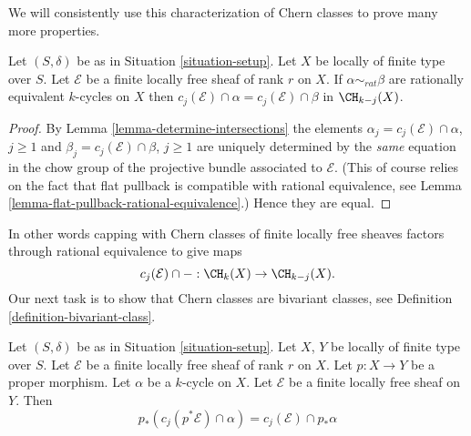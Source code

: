 \noindent
We will consistently use this characterization of Chern classes
to prove many more properties.

\begin{lemma}
\label{lemma-cap-chern-class-factors-rational-equivalence}
Let $(S, \delta)$ be as in Situation \ref{situation-setup}.
Let $X$ be locally of finite type over $S$.
Let $\mathcal{E}$ be a finite locally free sheaf of rank $r$ on $X$.
If $\alpha \sim_{rat} \beta$ are rationally equivalent $k$-cycles
on $X$ then $c_j(\mathcal{E}) \cap \alpha = c_j(\mathcal{E}) \cap \beta$
in $\CH_{k - j}(X)$.
\end{lemma}

\begin{proof}
By Lemma \ref{lemma-determine-intersections} the elements
$\alpha_j = c_j(\mathcal{E}) \cap \alpha$, $j \geq 1$ and
$\beta_j = c_j(\mathcal{E}) \cap \beta$, $j \geq 1$ are uniquely determined
by the {\it same} equation in the chow group of the projective
bundle associated to $\mathcal{E}$. (This of course relies on the fact that
flat pullback is compatible with rational equivalence, see
Lemma \ref{lemma-flat-pullback-rational-equivalence}.) Hence they are equal.
\end{proof}

\noindent
In other words capping with Chern classes of
finite locally free sheaves factors through rational equivalence
to give maps
$$
c_j(\mathcal{E}) \cap - : \CH_k(X) \to \CH_{k - j}(X).
$$
Our next task is to show that Chern classes are bivariant classes, see
Definition \ref{definition-bivariant-class}.

\begin{lemma}
\label{lemma-pushforward-cap-cj}
Let $(S, \delta)$ be as in Situation \ref{situation-setup}.
Let $X$, $Y$ be locally of finite type over $S$.
Let $\mathcal{E}$ be a finite locally free sheaf of rank $r$ on $X$.
Let $p : X \to Y$ be a proper morphism.
Let $\alpha$ be a $k$-cycle on $X$.
Let $\mathcal{E}$ be a finite locally free sheaf on $Y$.
Then
$$
p_*(c_j(p^*\mathcal{E}) \cap \alpha) = c_j(\mathcal{E}) \cap p_*\alpha
$$
\end{lemma}

